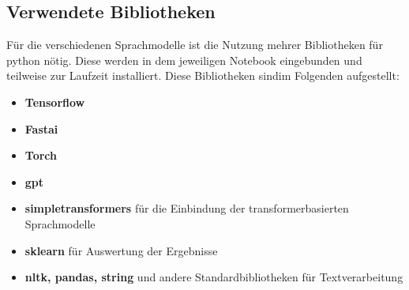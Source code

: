 \subsection{Verwendete Bibliotheken}
F\"ur die verschiedenen Sprachmodelle ist die Nutzung mehrer Bibliotheken f\"ur python n\"otig. Diese werden in dem jeweiligen Notebook eingebunden und teilweise zur Laufzeit installiert. Diese Bibliotheken sindim Folgenden aufgestellt:
\begin{itemize}
\item \textbf{Tensorflow}
\item \textbf{Fastai}
\item \textbf{Torch}
\item \textbf{gpt}
\item \textbf{simpletransformers} \cite{simpletransformers} f\"ur die Einbindung der transformerbasierten Sprachmodelle
\item \textbf{sklearn} f\"ur Auswertung der Ergebnisse
\item \textbf{nltk, pandas, string} und andere Standardbibliotheken f\"ur Textverarbeitung 
\end{itemize}

